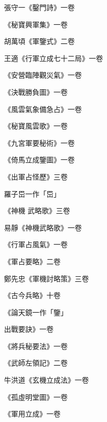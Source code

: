 \begin{pinyinscope}
 張守一《鑿門詩》一卷



 《秘寶興軍集》一卷



 胡萬頃《軍鑒式》二卷



 王適《行軍立成七十二局》一卷



 《安營臨陣觀災氣》一卷



 《決戰勝負圖》一卷



 《風雲氣象備急占》一卷



 《秘寶風雲歌》一卷



 《九宮軍要秘術》一卷



 《倚馬立成鑒圖》一卷



 《出軍占怪歷》三卷



 羅子岊一作「岊」



 《神機
 武略歌》三卷



 易靜《神機武略歌》一卷



 《行軍占風氣》一卷



 《軍占要略》二卷



 鄭先忠《軍機討略策》三卷



 《古今兵略》十卷



 《論天鏡一作「鑒」



 出戰要訣》一卷



 《將兵秘要法》一卷



 《武師左領記》二卷



 牛洪道《玄機立成法》一卷



 《孤虛明堂圖》一卷



 《軍用立成》一卷




\end{pinyinscope}
